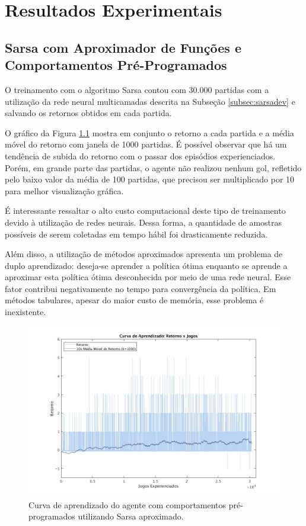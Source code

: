 \chapter{Resultados Experimentais}
\label{chap:Resultados}





\section{Sarsa com Aproximador de Funções e Comportamentos Pré-Programados}

O treinamento com o algoritmo Sarsa contou com 30.000 partidas com a utilização da rede neural multicamadas descrita na Subseção \ref{subsec:sarsadev} e salvando os retornos obtidos em cada partida.

O gráfico da Figura \ref{fig:single-agent-sarsa-behaviors} mostra em conjunto o retorno a cada partida e a média móvel do retorno com janela de 1000 partidas. É possível observar que há um tendência de subida do retorno com o passar dos episódios experienciados. Porém, em grande parte das partidas, o agente não realizou nenhum gol, refletido pelo baixo valor da média de 100 partidas, que precisou ser multiplicado por 10 para melhor visualização gráfica.

É interessante ressaltar o alto custo computacional deste tipo de treinamento devido à utilização de redes neurais. Dessa forma, a quantidade de amostras possíveis de serem coletadas em tempo hábil foi drasticamente reduzida.

Além disso, a utilização de métodos aproximados apresenta um problema de duplo aprendizado: deseja-se aprender a política ótima enquanto se aprende a aproximar esta política ótima desconhecida por meio de uma rede neural. Esse fator contribui negativamente no tempo para convergência da política. Em métodos tabulares, apesar do maior custo de memória, esse problema é inexistente.

\begin{figure}[H]
	\includegraphics[width=0.9\linewidth]{figs/curva-sarsa-1.jpg}
	\centering
	\caption{Curva de aprendizado do agente com comportamentos pré-programados utilizando Sarsa aproximado.}
	\label{fig:single-agent-sarsa-behaviors}
\end{figure}

